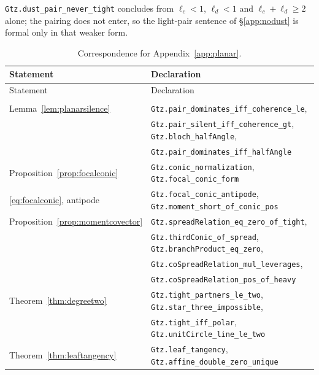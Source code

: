 \texttt{Gtz.dust\_pair\_never\_tight} concludes from $\ell_c<1$,
$\ell_d<1$ and $\ell_c+\ell_d\ge2$ alone; the pairing does not enter, so
the light-pair sentence of \S\ref{app:nodust} is formal only in that
weaker form.

{\small
\begin{longtable}{@{}ll@{}}
\toprule
Statement & Declaration \\
\midrule
\endfirsthead
\toprule
Statement & Declaration \\
\midrule
\endhead
\endfoot
\bottomrule
\caption{Correspondence for Appendix~\ref{app:planar}.}
\label{tab:leanplanar}\\
\endlastfoot
Lemma~\ref{lem:planarsilence}  & \texttt{Gtz.pair\_dominates\_iff\_coherence\_le}, \\
                               & \texttt{Gtz.pair\_silent\_iff\_coherence\_gt},
                                 \texttt{Gtz.bloch\_halfAngle}, \\
                               & \texttt{Gtz.pair\_dominates\_iff\_halfAngle} \\
Proposition~\ref{prop:focalconic}
                               & \texttt{Gtz.conic\_normalization},
                                 \texttt{Gtz.focal\_conic\_form} \\
\eqref{eq:focalconic}, antipode& \texttt{Gtz.focal\_conic\_antipode},
                                 \texttt{Gtz.moment\_short\_of\_conic\_pos} \\
Proposition~\ref{prop:momentcovector}
                               & \texttt{Gtz.spreadRelation\_eq\_zero\_of\_tight}, \\
                               & \texttt{Gtz.thirdConic\_of\_spread},
                                 \texttt{Gtz.branchProduct\_eq\_zero}, \\
                               & \texttt{Gtz.coSpreadRelation\_mul\_leverages}, \\
                               & \texttt{Gtz.coSpreadRelation\_pos\_of\_heavy} \\
Theorem~\ref{thm:degreetwo}    & \texttt{Gtz.tight\_partners\_le\_two},
                                 \texttt{Gtz.star\_three\_impossible}, \\
                               & \texttt{Gtz.tight\_iff\_polar},
                                 \texttt{Gtz.unitCircle\_line\_le\_two} \\
Theorem~\ref{thm:leaftangency} & \texttt{Gtz.leaf\_tangency},
                                 \texttt{Gtz.affine\_double\_zero\_unique} \\

\end{longtable}}
